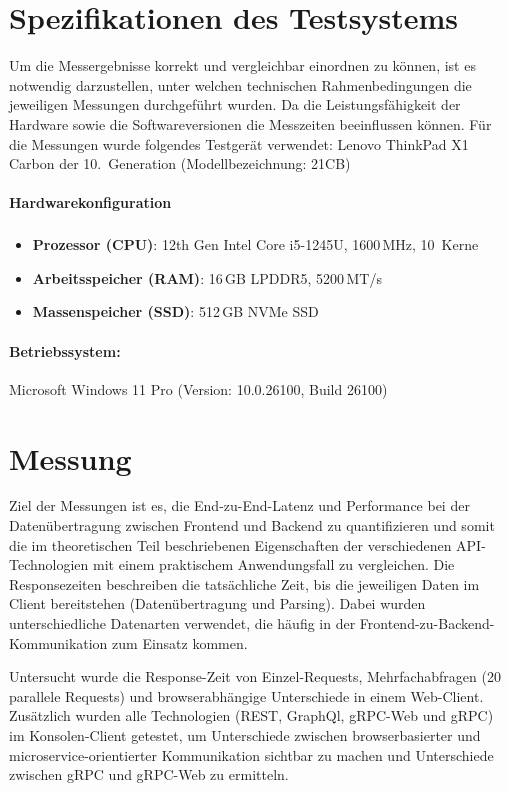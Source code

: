 \section{Spezifikationen des Testsystems}
Um die Messergebnisse korrekt und vergleichbar einordnen zu können, ist es notwendig darzustellen, unter welchen technischen Rahmenbedingungen die jeweiligen Messungen durchgeführt wurden. Da die Leistungsfähigkeit der Hardware sowie die Softwareversionen die Messzeiten beeinflussen können.
Für die Messungen wurde folgendes Testgerät verwendet:  
Lenovo ThinkPad X1 Carbon der 10.\ Generation (Modellbezeichnung: 21CB)
\paragraph{Hardwarekonfiguration}
\begin{itemize}
	\item \textbf{Prozessor (CPU)}: 12th Gen Intel\textsuperscript{\textregistered} Core\texttrademark{} i5-1245U, 1600\,MHz, 10~Kerne
	\item \textbf{Arbeitsspeicher (RAM)}: 16\,GB LPDDR5, 5200\,MT/s
	\item \textbf{Massenspeicher (SSD)}: 512\,GB NVMe SSD
\end{itemize}

\paragraph{Betriebssystem:}
Microsoft Windows 11 Pro (Version: 10.0.26100, Build 26100)

\clearpage
\section{Messung}
Ziel der Messungen ist es, die End-zu-End-Latenz und Performance bei der Datenübertragung zwischen Frontend und Backend zu quantifizieren und somit die im theoretischen Teil beschriebenen Eigenschaften der verschiedenen API-Technologien mit einem praktischem Anwendungsfall zu vergleichen.  
Die Responsezeiten beschreiben die tatsächliche Zeit, bis die jeweiligen Daten im Client bereitstehen (Datenübertragung und Parsing). Dabei wurden unterschiedliche Datenarten verwendet, die häufig in der Frontend-zu-Backend-Kommunikation zum Einsatz kommen.  

Untersucht wurde die Response-Zeit von Einzel-Requests, Mehrfachabfragen (20 parallele Requests) und browserabhängige Unterschiede in einem Web-Client. Zusätzlich wurden alle Technologien (REST, GraphQl, gRPC-Web und gRPC) im Konsolen-Client getestet, um Unterschiede zwischen browserbasierter und microservice-orientierter Kommunikation sichtbar zu machen und Unterschiede zwischen gRPC und gRPC-Web zu ermitteln.


